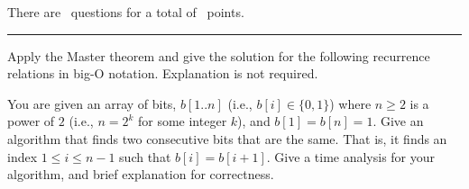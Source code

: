 \documentclass[answers]{exam}
\newenvironment{answer}{%
     \renewcommand{\solutiontitle}{\noindent\textbf{Answer:}\enspace}
     \begin{solution}
     }{%
     \end{solution}
     \renewcommand{\solutiontitle}{\noindent\textbf{Solution:}\enspace}
 }
\begin{document}
\vspace{0.1in}


\vspace{0.1in}
There are \numquestions\, questions for a total of \numpoints\, points.
\vspace{0.1in}
\hrule
 \vspace{0.2in}
\begin{questions}
 
\question[3] 

Apply the Master theorem and give the solution for the following recurrence relations in big-O notation. Explanation is not required.


\question[7]

You are given an array of bits, $b[1..n]$ (i.e., $b[i] \in \{0,1\}$) where $n \geq 2$ is a power of $2$ (i.e., $n = 2^k$ for some integer $k$), and $b[1]=b[n]=1$. Give an algorithm that finds two
    consecutive bits that are the same. That is, it finds an index $1 \le i \le n-1$ such that  $b[i] = b[i+1]$. Give a time analysis for your algorithm, and brief explanation for correctness.


\end{questions}
\end{document}
